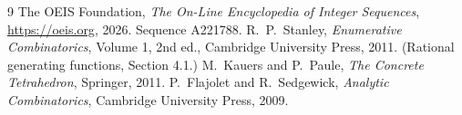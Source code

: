 \documentclass[11pt,a4paper]{article}
\theoremstyle{plain}
\theoremstyle{definition}
\begin{document}
\begin{thebibliography}{9}
 The OEIS Foundation, \emph{The On-Line Encyclopedia of Integer
Sequences}, \url{https://oeis.org}, 2026. Sequence A221788.
 R.~P.~Stanley, \emph{Enumerative Combinatorics}, Volume 1, 2nd ed.,
Cambridge University Press, 2011. (Rational generating functions, Section 4.1.)
 M.~Kauers and P.~Paule, \emph{The Concrete Tetrahedron}, Springer, 2011.
 P.~Flajolet and R.~Sedgewick, \emph{Analytic Combinatorics}, Cambridge
University Press, 2009.
\end{thebibliography}
\end{document}
